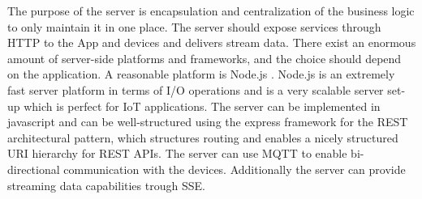 The purpose of the server is encapsulation and centralization of the business logic to only maintain it in one place. The server should expose services through HTTP to the App and devices and delivers stream data. There exist an enormous amount of server-side platforms and frameworks, and the choice should depend on the application. A reasonable platform is Node.js \cite{node}. Node.js is an extremely fast server platform in terms of I/O operations and is a very scalable server set-up which is perfect for IoT applications. The server can be implemented in javascript and can be well-structured using the express framework \cite{express} for the REST architectural pattern, which structures routing and enables a nicely structured URI hierarchy for REST APIs. The server can use MQTT to enable bi-directional communication with the devices. Additionally the server can provide streaming data capabilities trough SSE. 